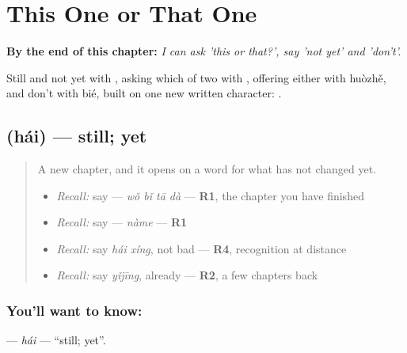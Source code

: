 
\chapter{This One or That One}
\label{ch:zh-this-one-or-that-one}

\begin{chapteropening}
\textbf{By the end of this chapter:} \emph{I can ask 'this or that?', say 'not yet' and 'don't'.}

Still and not yet with , asking which of two with , offering either with huòzhě, and don't with bié, built on one new written character: .
\end{chapteropening}

\section[\texorpdfstring{\zh{还} (hái)}{还 (hái)}]{ (hái) — still; yet}

\label{lesson:ZH-C154-hai}



\begin{quote}
A new chapter, and it opens on a word for what has not changed yet.

\begin{itemize}
\raggedright
  \item \emph{Recall:} say  — \emph{wǒ bǐ tā dà} — \textbf{R1}, the chapter you have finished
  \item \emph{Recall:} say  — \emph{nàme} — \textbf{R1}
  \item \emph{Recall:} say \emph{hái xíng}, not bad — \textbf{R4}, recognition at distance
  \item \emph{Recall:} say \emph{yǐjīng}, already — \textbf{R2}, a few chapters back
\end{itemize}
\end{quote}

\subsection*{You'll want to know: }
\textbf{} — \emph{hái} — \textquotedblleft{}still; yet\textquotedblright{}.


